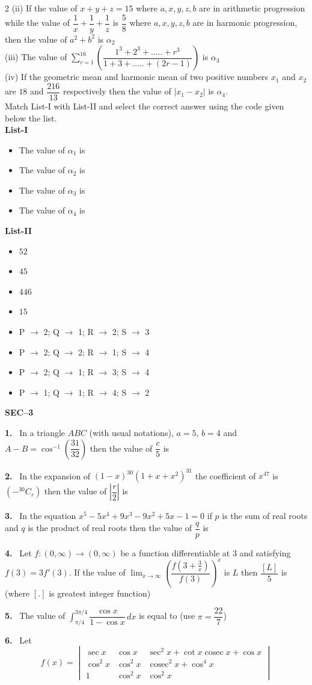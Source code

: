 \documentclass[10pt]{extarticle}
\newcommand{\sect}[1]{\par\smallskip\noindent\textbf{#1}\par}
\newcommand{\qn}[1]{\par\smallskip\noindent\textbf{#1.}~}
\newenvironment{qoptions}{\begin{itemize}[leftmargin=1.8em,itemsep=1pt,topsep=2pt,label={}]}{\end{itemize}}
\newcommand{\opt}[2]{\item[(#1)] #2}
\begin{document}
\begin{multicols}{2}
(ii) If the value of $x+y+z=15$ where $a,x,y,z,b$ are in arithmetic progression while the value of $\dfrac1x+\dfrac1y+\dfrac1z$ is $\dfrac58$ where $a,x,y,z,b$ are in harmonic progression, then the value of $a^2+b^2$ is $\alpha_2$\\
(iii) The value of $\displaystyle\sum_{r=1}^{16}\left(\dfrac{1^3+2^3+\ldots..+r^3}{1+3+\ldots..+(2r-1)}\right)$ is $\alpha_3$\\
(iv) If the geometric mean and harmonic mean of two positive numbers $x_1$ and $x_2$ are $18$ and $\dfrac{216}{13}$ respectively then the value of $|x_1-x_2|$ is $\alpha_4$.\\
Match List-I with List-II and select the correct answer using the code given below the list.\\
\textbf{List-I}
\begin{qoptions}
\opt{P}{The value of $\alpha_1$ is}
\opt{Q}{The value of $\alpha_2$ is}
\opt{R}{The value of $\alpha_3$ is}
\opt{S}{The value of $\alpha_4$ is}
\end{qoptions}
\noindent\textbf{List-II}
\begin{qoptions}
\opt{1}{$52$}
\opt{2}{$45$}
\opt{3}{$446$}
\opt{4}{$15$}
\end{qoptions}
\begin{qoptions}
\opt{A}{P $\to$ 2; Q $\to$ 1; R $\to$ 2; S $\to$ 3}
\opt{B}{P $\to$ 2; Q $\to$ 2; R $\to$ 1; S $\to$ 4}
\opt{C}{P $\to$ 2; Q $\to$ 1; R $\to$ 3; S $\to$ 4}
\opt{D}{P $\to$ 1; Q $\to$ 1; R $\to$ 4; S $\to$ 2}
\end{qoptions}
\sect{SEC--3}
\qn{1} In a triangle $ABC$ (with usual notations), $a=5$, $b=4$ and $A-B=\cos^{-1}\left(\dfrac{31}{32}\right)$ then the value of $\dfrac c5$ is
\qn{2} In the expansion of $(1-x)^{30}(1+x+x^2)^{31}$ the coefficient of $x^{47}$ is $(-{}^{30}C_r)$ then the value of $\left|\dfrac r2\right|$ is
\qn{3} In the equation $x^5-5x^4+9x^3-9x^2+5x-1=0$ if $p$ is the sum of real roots and $q$ is the product of real roots then the value of $\dfrac qp$ is
\qn{4} Let $f:(0,\infty)\to(0,\infty)$ be a function differentiable at $3$ and satisfying $f(3)=3f'(3)$. If the value of $\displaystyle\lim_{x\to\infty}\left(\dfrac{f\left(3+\frac3x\right)}{f(3)}\right)^x$ is $L$ then $\dfrac{[L]}{5}$ is (where $[.]$ is greatest integer function)
\qn{5} The value of $\displaystyle\int_{\pi/4}^{3\pi/4}\dfrac{\cos x}{1-\cos x}\,dx$ is equal to (use $\pi=\dfrac{22}{7}$)
\qn{6} Let
\[f(x)=\begin{vmatrix}\sec x&\cos x&\sec^2x+\cot x\operatorname{cosec}x+\cos x\\\cos^2x&\cos^2x&\operatorname{cosec}^2x+\cos^4x\\1&\cos^2x&\cos^2x\end{vmatrix}\]

\end{multicols}
\end{document}
